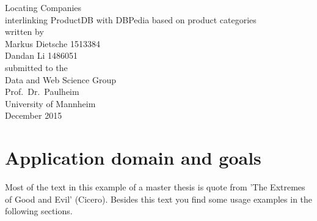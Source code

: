 \documentclass[11pt,titlepage,oneside,openany]{book}
\begin{document}
\begin{titlepage}
	\vspace*{2cm}
  \begin{center}
   {\Huge Locating Companies \\}
	\vspace*{0.5cm}
   {\large  interlinking ProductDB with DBPedia based on product categories \\}
   \vspace{2cm} 
   \vspace{2cm}
   {written by\\
    Markus Dietsche 1513384 \\
    Dandan Li 1486051\\
   }
   \vspace{1cm} 
   {submitted to the\\
    Data and Web Science Group \\
    Prof.\ Dr.\ Paulheim\\
    University of Mannheim\\} \vspace{2cm}
   {December 2015}
  \end{center}
\end{titlepage} 

\tableofcontents
\newpage

\listofalgorithms

\listoffigures

\listoftables


\newpage



\chapter{Application domain and goals}
\label{cha:goal}

Most of the text in this example of a master thesis is quote from 'The Extremes of Good and Evil' (Cicero). Besides this text you find some usage examples in the following sections.
\end{document}
